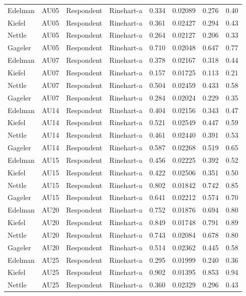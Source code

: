 \documentclass{monashthesis}
\begin{document}
\begin{center}
\begin{longtable}{llllllll}
Edelman & AU05 & Respondent & Rinehart-a & 0.334 & 0.02089 & 0.276 & 0.40 \\
Kiefel & AU05 & Respondent & Rinehart-a & 0.361 & 0.02427 & 0.294 & 0.43 \\
Nettle & AU05 & Respondent & Rinehart-a & 0.264 & 0.02127 & 0.206 & 0.33 \\
Gageler & AU05 & Respondent & Rinehart-a & 0.710 & 0.02048 & 0.647 & 0.77 \\
Edelman & AU07 & Respondent & Rinehart-a & 0.378 & 0.02167 & 0.318 & 0.44 \\
Kiefel & AU07 & Respondent & Rinehart-a & 0.157 & 0.01725 & 0.113 & 0.21 \\
Nettle & AU07 & Respondent & Rinehart-a & 0.504 & 0.02459 & 0.433 & 0.58 \\
Gageler & AU07 & Respondent & Rinehart-a & 0.284 & 0.02024 & 0.229 & 0.35 \\
Edelman & AU14 & Respondent & Rinehart-a & 0.404 & 0.02156 & 0.343 & 0.47 \\
Kiefel & AU14 & Respondent & Rinehart-a & 0.521 & 0.02549 & 0.447 & 0.59 \\
Nettle & AU14 & Respondent & Rinehart-a & 0.461 & 0.02440 & 0.391 & 0.53 \\
Gageler & AU14 & Respondent & Rinehart-a & 0.587 & 0.02268 & 0.519 & 0.65 \\
Edelman & AU15 & Respondent & Rinehart-a & 0.456 & 0.02225 & 0.392 & 0.52 \\
Kiefel & AU15 & Respondent & Rinehart-a & 0.422 & 0.02506 & 0.351 & 0.50 \\
Nettle & AU15 & Respondent & Rinehart-a & 0.802 & 0.01842 & 0.742 & 0.85 \\
Gageler & AU15 & Respondent & Rinehart-a & 0.641 & 0.02212 & 0.574 & 0.70 \\
Edelman & AU20 & Respondent & Rinehart-a & 0.752 & 0.01876 & 0.694 & 0.80 \\
Kiefel & AU20 & Respondent & Rinehart-a & 0.849 & 0.01748 & 0.791 & 0.89 \\
Nettle & AU20 & Respondent & Rinehart-a & 0.743 & 0.02084 & 0.678 & 0.80 \\
Gageler & AU20 & Respondent & Rinehart-a & 0.514 & 0.02362 & 0.445 & 0.58 \\
Edelman & AU25 & Respondent & Rinehart-a & 0.295 & 0.01999 & 0.240 & 0.36 \\
Kiefel & AU25 & Respondent & Rinehart-a & 0.902 & 0.01395 & 0.853 & 0.94 \\
Nettle & AU25 & Respondent & Rinehart-a & 0.360 & 0.02329 & 0.296 & 0.43 \\

\end{longtable}
\end{center}
\end{document}
